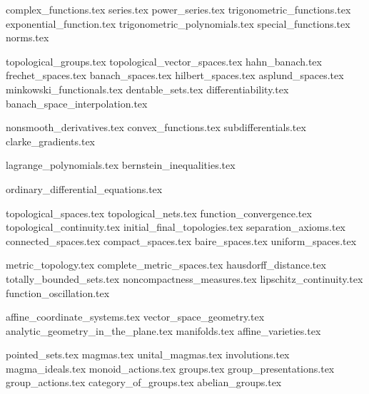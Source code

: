 \documentclass{notebook}
\begin{document}
{complex_functions.tex}
{series.tex}
{power_series.tex}
{trigonometric_functions.tex}
{exponential_function.tex}
{trigonometric_polynomials.tex}
{special_functions.tex}
{norms.tex}

{topological_groups.tex}
{topological_vector_spaces.tex}
{hahn_banach.tex}
{frechet_spaces.tex}
{banach_spaces.tex}
{hilbert_spaces.tex}
{asplund_spaces.tex}
{minkowski_functionals.tex}
{dentable_sets.tex}
{differentiability.tex}
{banach_space_interpolation.tex}

{nonsmooth_derivatives.tex}
{convex_functions.tex}
{subdifferentials.tex}
{clarke_gradients.tex}

{lagrange_polynomials.tex}
{bernstein_inequalities.tex}

{ordinary_differential_equations.tex}

{topological_spaces.tex}
{topological_nets.tex}
{function_convergence.tex}
{topological_continuity.tex}
{initial_final_topologies.tex}
{separation_axioms.tex}
{connected_spaces.tex}
{compact_spaces.tex}
{baire_spaces.tex}
{uniform_spaces.tex}

{metric_topology.tex}
{complete_metric_spaces.tex}
{hausdorff_distance.tex}
{totally_bounded_sets.tex}
{noncompactness_measures.tex}
{lipschitz_continuity.tex}
{function_oscillation.tex}

{affine_coordinate_systems.tex}
{vector_space_geometry.tex}
{analytic_geometry_in_the_plane.tex}
{manifolds.tex}
{affine_varieties.tex}

{pointed_sets.tex}
{magmas.tex}
{unital_magmas.tex}
{involutions.tex}
{magma_ideals.tex}
{monoid_actions.tex}
{groups.tex}
{group_presentations.tex}
{group_actions.tex}
{category_of_groups.tex}
{abelian_groups.tex}
\end{document}
